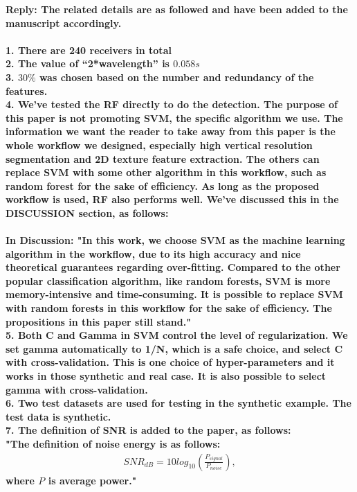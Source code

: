 \begin{enumerate}
\textbf{Reply: The related details are as followed and have been added to the manuscript accordingly. \\ \\
1. There are 240 receivers in total  \\
2. The value of “2*wavelength” is $0.058s$ \\
3. $30\%$ was chosen based on the number and redundancy of the features. \\
4. We've tested the RF directly to do the detection. The purpose of this paper is not promoting SVM, the specific algorithm we use. The information we want the reader to take away from this paper is the whole workflow we designed, especially high vertical resolution segmentation and 2D texture feature extraction. The others can replace SVM with some other algorithm in this workflow, such as random forest for the sake of efficiency. As long as the proposed workflow is used, RF also performs well. We've discussed this in the DISCUSSION section, as follows: \\ \\
In \textbf{Discussion}: "In this work, we choose SVM as the machine learning algorithm in the workflow, due to its high accuracy and nice theoretical guarantees regarding over-fitting. Compared to the other popular classification algorithm, like random forests, SVM is more memory-intensive and time-consuming. It is possible to replace SVM with random forests in this workflow for the sake of efficiency. The propositions in this paper still stand." \\
5. Both C and Gamma in SVM control the level of regularization. We set gamma automatically to 1/N, which is a safe choice, and select C with cross-validation. This is one choice of hyper-parameters and it works in those synthetic and real case. It is also possible to select gamma with cross-validation. \\
6. Two test datasets are used for testing in the synthetic example. The test data is synthetic. \\
7. The definition of SNR is added to the paper, as follows: \\
"The definition of noise energy is as follows:
\begin{equation}
\begin{split}
      SNR_{dB} = 10 log_{10}\left( \frac{P_{signal}}{P_{noise}} \right),
\label{eq2}
\end{split}
\end{equation}
where $P$ is average power." \\
}
\end{enumerate}
